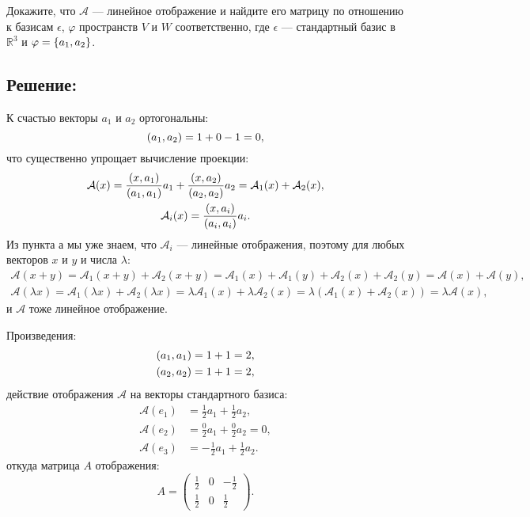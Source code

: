\documentclass[12pt]{article}
\begin{document}
    Докажите, что $\mathcal{A}$ --- линейное отображение и найдите его матрицу по отношению к базисам $\epsilon$, $\varphi$ пространств $V$ и $W$ соответственно, где $\epsilon$ ---
    стандартный базис в $\mathbb{R}^3$ и $\varphi = \left \{ a_1, a_2 \right \}$.

    \subsection*{Решение:}
    К счастью векторы $a_1$ и $a_2$ ортогональны:
    \[
        \left ( a_1, a_2 \right ) = 1 + 0 - 1 = 0,
    \]
    что существенно упрощает вычисление проекции:
    \begin{gather*}
        \mathcal{A}(x)
        = \frac{\left ( x, a_1 \right )}{\left ( a_1, a_1 \right )} a_1 + \frac{\left ( x, a_2 \right )}{\left ( a_2, a_2 \right )} a_2
        = \mathcal{A}_1(x) + \mathcal{A}_2(x) , \\
        \mathcal{A}_i(x) = \frac{\left ( x, a_i \right )}{\left ( a_i, a_i \right )} a_i .
    \end{gather*}
    Из пункта а мы уже знаем, что $\mathcal{A}_i$ --- линейные отображения, поэтому для любых векторов $x$ и $y$ и числа $\lambda$:
    \begin{gather*}
        \mathcal{A}(x + y)
        = \mathcal{A}_1(x + y) + \mathcal{A}_2(x + y)
        = \mathcal{A}_1(x) + \mathcal{A}_1(y) + \mathcal{A}_2(x) + \mathcal{A}_2(y)
        = \mathcal{A}(x) + \mathcal{A}(y), \\
        \mathcal{A}(\lambda x)
        = \mathcal{A}_1(\lambda x) + \mathcal{A}_2(\lambda x)
        = \lambda \mathcal{A}_1(x) + \lambda \mathcal{A}_2(x)
        = \lambda \left ( \mathcal{A}_1(x) + \mathcal{A}_2(x) \right )
        = \lambda \mathcal{A}(x),
    \end{gather*}
    и $\mathcal{A}$ тоже линейное отображение.

    Произведения:
    \begin{gather*}
        \left ( a_1, a_1 \right ) = 1 + 1 = 2, \\
        \left ( a_2, a_2 \right ) = 1 + 1 = 2 ,
    \end{gather*}
    действие отображения $\mathcal{A}$ на векторы стандартного базиса:
    \begin{align*}
        \mathcal{A}(e_1) & = \frac{1}{2} a_1 + \frac{1}{2} a_2 , \\
        \mathcal{A}(e_2) & = \frac{0}{2} a_1 + \frac{0}{2} a_2  = 0 , \\
        \mathcal{A}(e_3) & = -\frac{1}{2} a_1 + \frac{1}{2} a_2 .
    \end{align*}
    откуда матрица $A$ отображения:
    \[
        A
        =
        \begin{pmatrix}
            \frac{1}{2} & 0 & - \frac{1}{2} \\
            \frac{1}{2} & 0 & \frac{1}{2}
        \end{pmatrix}
        .
    \]
\end{document}
